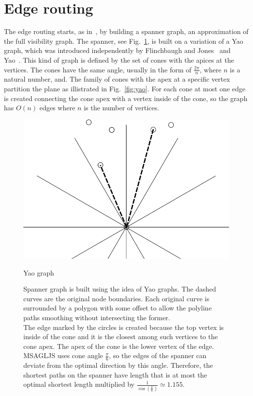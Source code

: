 \documentclass{gd-llncs}
\begin{document}
\section*{Edge routing}
The edge routing starts, as in~\cite{dwyer2010fast}, by building a spanner graph, an approximation of the full visibility graph. The spanner, see Fig.~\ref{fig:spanner}, is built on a variation of a Yao graph, which was introduced independently by Flinchbaugh and Jones~\cite{flinchbaugh1981strong}  and Yao~\cite{yao1982constructing}. This kind of graph is defined by the set of cones with the apices at the vertices. The cones have the same angle, usually in the form of $\frac{2\pi} {n}$, where $n$ is a natural number, and.  The family of cones with the apex at a specific vertex partition the plane as illistrated in Fig.~\ref{fig:yao}. For each cone at most one edge is created connecting the cone apex with a vertex inside of the cone, so the graph has $O(n)$ edges where $n$ is the number of vertices. \\
\begin{figure}[]
  \centering
  \begin{minipage}[b]{0.5\textwidth}
    \includegraphics[width=\textwidth]{yao.pdf}
    \caption{\small{Yao graph}}
    \label{fig:yao}
  \end{minipage}
  \vfill
  \begin{minipage}[b]{\textwidth}
    
    \caption{\small{Spanner graph is built using the idea of Yao graphs. The dashed curves are the original node boundaries. Each original curve is surrounded by a polygon with some offset to allow the polyline paths smoothing without intersecting the former. \\
        The edge marked by the circles is created because the top vertex is inside of the cone and it is the closest among such vertices to the cone apex. The apex of the cone is the lower vertex of the edge. \\MSAGLJS uses cone angle $\frac{\pi}{6}$, so the edges of the spanner can deviate from the optimal direction by this angle. Therefore, the shortest paths on the spanner have length that is at most the optimal shortest length multiplied by $\frac{1}{\cos(\frac{\pi}{6})} \simeq 1.155$.}
    }
    \label{fig:spanner}
  \end{minipage}
\end{figure}
\end{document}
